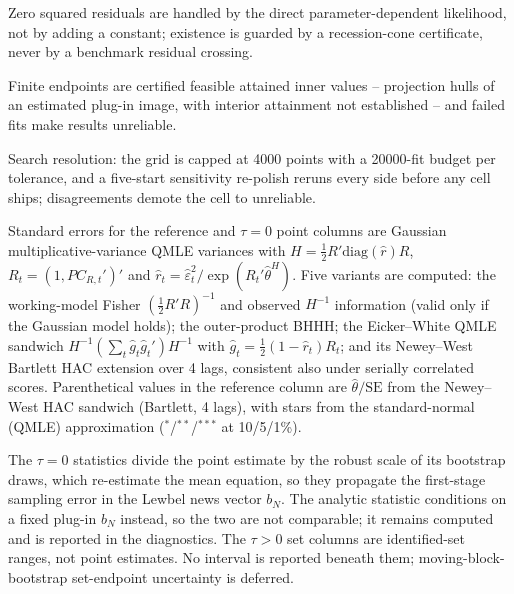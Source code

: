 \documentclass[11pt]{article}
\begin{document}
\begin{table}[!htbp]
\begin{threeparttable}
\begin{tablenotes}[flushleft]
\item Zero squared residuals are handled by the direct parameter-dependent likelihood, not by adding a constant; existence is guarded by a recession-cone certificate, never by a benchmark residual crossing.
\item Finite endpoints are certified feasible attained inner values -- projection hulls of an estimated plug-in image, with interior attainment not established -- and failed fits make results unreliable.
\item Search resolution: the grid is capped at 4000 points with a 20000-fit budget per tolerance, and a five-start sensitivity re-polish reruns every side before any cell ships; disagreements demote the cell to unreliable.
\item Standard errors for the reference and $\tau{=}0$ point columns are Gaussian multiplicative-variance QMLE variances with $H = \frac{1}{2}R'\mathrm{diag}(\hat r)R$, $R_t = (1, PC_{R,t}')'$ and $\hat r_t = \hat\varepsilon_t^2 / \exp(R_t'\hat\theta^{H})$. Five variants are computed: the working-model Fisher $(\frac{1}{2}R'R)^{-1}$ and observed $H^{-1}$ information (valid only if the Gaussian model holds); the outer-product BHHH; the Eicker--White QMLE sandwich $H^{-1} (\sum_t \hat g_t \hat g_t')H^{-1}$ with $\hat g_t = \frac{1}{2}(1 - \hat r_t)R_t$; and its Newey--West Bartlett HAC extension over 4 lags, consistent also under serially correlated scores. Parenthetical values in the reference column are $\hat\theta/\mathrm{SE}$ from the Newey--West HAC sandwich (Bartlett, 4 lags), with stars from the standard-normal (QMLE) approximation ($^{*}$/$^{**}$/$^{***}$ at 10/5/1\%).
\item The $\tau{=}0$ statistics divide the point estimate by the robust scale of its bootstrap draws, which re-estimate the mean equation, so they propagate the first-stage sampling error in the Lewbel news vector $b_N$. The analytic statistic conditions on a fixed plug-in $b_N$ instead, so the two are not comparable; it remains computed and is reported in the diagnostics. The $\tau{>}0$ set columns are identified-set ranges, not point estimates. No interval is reported beneath them; moving-block-bootstrap set-endpoint uncertainty is deferred.
\end{tablenotes}
\end{threeparttable}
\end{table}
\end{document}
